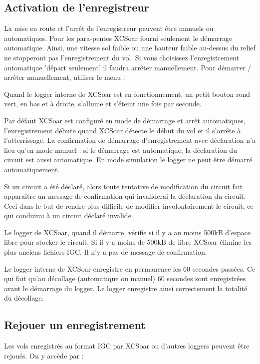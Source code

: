 \subsection*{Activation de l'enregistreur}
La mise en route et l'arrêt de l'enregistreur peuvent être manuels ou automatiques. Pour les para-pentes XCSoar fourni seulement le démarrage automatique. Ainsi, une vitesse sol faible ou une hauteur faible au-dessus du relief ne stopperont pas l'enregistrement du vol. Si vous choisissez l'enregistrement automatique 'départ seulement' il faudra arrêter manuellement. Pour démarrer / arrêter manuellement, utiliser le menu :
\begin{quote}
\blink{}
\blink{}
\end{quote}

Quand le logger interne de XCSoar est en fonctionnement, un petit bouton rond vert, en bas et à droite, s'allume et s'éteint une fois par seconde.

Par défaut XCSoar est configuré en mode de démarrage et arrêt automatiques, l'enregistrement débute quand XCSoar détecte le début du vol et il s'arrête à l'atterrissage. La confirmation de démarrage d'enregistrement avec déclaration n'a lieu qu'en mode manuel : si le démarrage est automatique, la déclaration du circuit est aussi automatique. En mode simulation le logger ne peut être démarré automatiquement.

Si un circuit a été déclaré, alors toute tentative de modification du circuit fait apparaitre un message de confirmation qui invaliderai la déclaration du circuit. Ceci dans le but de rendre plus difficile de modifier involontairement le circuit, ce qui conduirai à un circuit déclaré invalide.

Le logger de XCSoar, quand il démarre, vérifie si il y a au moins 500kB d'espace libre pour stocker le circuit. Si il y a moins de 500kB de libre XCSoar élimine les plus anciens fichiers IGC. Il n'y a pas de message de confirmation. \warning

Le logger interne de XCSoar enregistre en permanence les 60 secondes passées. Ce qui fait qu'au décollage (automatique ou manuel) 60 secondes sont enregistrées avant le démarrage du logger. Le logger enregistre ainsi correctement la totalité du décollage.

\subsection*{Rejouer un enregistrement}\label{sec:logger-replay}
Les vols enregistrés au format IGC par XCSoar ou d'autres loggers peuvent être rejoués. On y accède par :
\begin{quote}
\blink{}
\end{quote}

